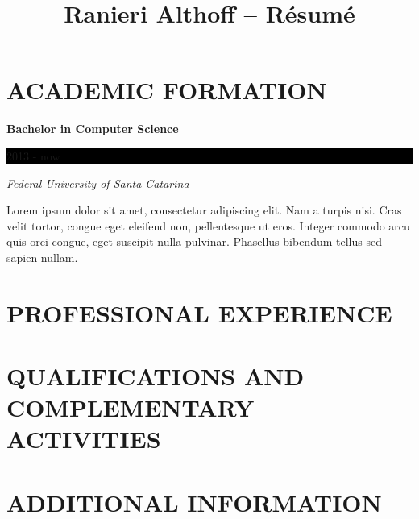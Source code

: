 \documentclass[10pt]{article}
\newcommand{\sectiontitle}[1]{\section*{\uppercase{#1}}}
\begin{document}
\title{Ranieri Althoff -- Résumé}

\sectiontitle{Academic Formation}
\textbf{Bachelor in Computer Science} \hfill
\colorbox{black}{
	\parbox{8em}{
		\hfill \color{white} 2013 - now
	}
} \par
\textit{Federal University of Santa Catarina} \par
\small Lorem ipsum dolor sit amet, consectetur adipiscing elit. Nam a turpis
	nisi. Cras velit tortor, congue eget eleifend non, pellentesque ut eros.
	Integer commodo arcu quis orci congue, eget suscipit nulla pulvinar.
	Phasellus bibendum tellus sed sapien nullam. \par
\normalsize


\sectiontitle{Professional Experience}


\sectiontitle{Qualifications and Complementary Activities}


\sectiontitle{Additional Information}
\end{document}
